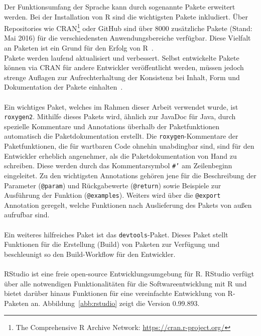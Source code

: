 Der Funktionsumfang der Sprache kann durch sogenannte Pakete erweitert werden. Bei der Installation von R sind die wichtigsten Pakete inkludiert. Über Repositories wie CRAN\footnote{The Comprehensive R Archive Network: \url{https://cran.r-project.org/}} oder GitHub sind über 8000 zusätzliche Pakete (Stand: Mai 2016) für die verschiedensten Anwendungsbereiche verfügbar. Diese Vielfalt an Paketen ist ein Grund für den Erfolg von R~\cite[S.~18]{wickham2015r}.
\\
Pakete werden laufend aktualisiert und verbessert. Selbst entwickelte Pakete können via CRAN für andere Entwickler veröffentlicht werden, müssen jedoch strenge Auflagen zur Aufrechterhaltung der Konsistenz bei Inhalt, Form und Dokumentation der Pakete einhalten~\cite{wickham2015r}.  
\\
\\
Ein wichtiges Paket, welches im Rahmen dieser Arbeit verwendet wurde, ist \texttt{roxygen2}. Mithilfe dieses Pakets wird, ähnlich zur JavaDoc für Java, durch spezielle Kommentare und Annotations überhalb der Paketfunktionen automatisch die Paketdokumentation erstellt. Die \texttt{roxygen}-Kommentare der Paketfunktionen, die für wartbaren Code ohnehin unabdingbar sind, sind für den Entwickler erheblich angenehmer, als die Paketdokumentation von Hand zu schreiben. Diese werden durch das Kommentarsymbol \mbox{\texttt{\#'}} am Zeilenbeginn eingeleitet. Zu den wichtigsten Annotations gehören jene für die Beschreibung der Parameter (\texttt{@param}) und Rückgabewerte (\texttt{@return}) sowie Beispiele zur Ausführung der Funktion (\texttt{@examples}). Weiters wird über die \texttt{@export} Annotation geregelt, welche Funktionen nach Auslieferung des Pakets von außen aufrufbar sind.~\cite{roxygen}
\\
\\
Ein weiteres hilfreiches Paket ist das \texttt{devtools}-Paket. Dieses Paket stellt Funktionen für die Erstellung (Build) von Paketen zur Verfügung und beschleunigt so den Build-Workflow für den Entwickler.~\cite{devtools}
\\
\\
RStudio ist eine freie open-source Entwicklungsumgebung für R. RStudio verfügt über alle notwendigen Funktionalitäten für die Softwareentwicklung mit R und bietet darüber hinaus Funktionen für eine vereinfachte Entwicklung von R-Paketen an. Abbildung~\ref{abb:rstudio} zeigt die Version 0.99.893. 

